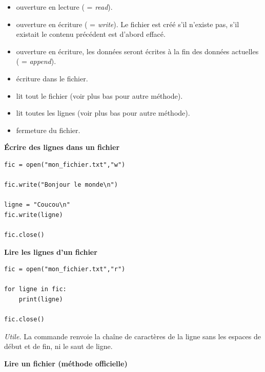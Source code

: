 \documentclass[11pt,class=report,crop=false]{standalone}
\begin{document}
\begin{itemize}
  \item {} \quad ouverture en lecture ( = \emph{read}).
  \item {} \quad ouverture en écriture ( = \emph{write}). Le fichier est créé s'il n'existe pas, s'il existait le contenu précédent est d'abord effacé.
  \item {} \quad ouverture en écriture, les données seront écrites à la fin des données actuelles ( = \emph{append}).
  
  \item {} \quad écriture dans le fichier.
  \item {} \quad lit tout le fichier (voir plus bas pour autre méthode).
  \item {} \quad lit toutes les lignes (voir plus bas pour autre méthode).
  
  \item {} \quad fermeture du fichier.
\end{itemize}

\bigskip

\textbf{\'Ecrire des lignes dans un fichier} 

\begin{lstlisting}
fic = open("mon_fichier.txt","w")

fic.write("Bonjour le monde\n")

ligne = "Coucou\n"
fic.write(ligne)

fic.close()
\end{lstlisting}



\bigskip

\textbf{Lire les lignes d'un fichier} 

\begin{lstlisting}
fic = open("mon_fichier.txt","r")

for ligne in fic:
    print(ligne)

fic.close()
\end{lstlisting}

\emph{Utile.} La commande  renvoie la chaîne de caractères de la ligne sans les espaces de début et de fin, ni le saut de ligne. 

\bigskip

\textbf{Lire un fichier (méthode officielle)} 
\end{document}
